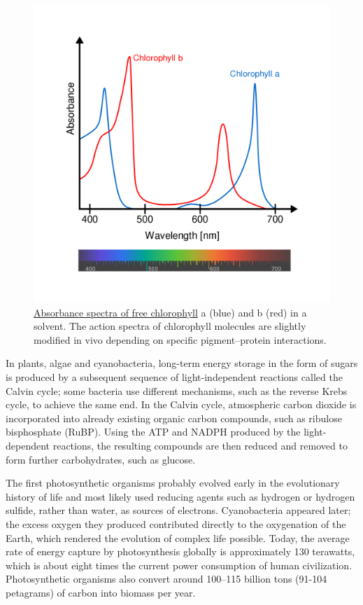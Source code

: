 \begin{figure}

{\centering \includegraphics[width=0.7\linewidth]{./figures/photosynthesis/Chlorophyll_ab_spectra-en} 

}

\caption{\href{https://commons.wikimedia.org/wiki/File:Chlorophyll_ab_spectra-en.svg}{Absorbance spectra of free chlorophyll} a (blue) and b (red) in a solvent. The action spectra of chlorophyll molecules are slightly modified in vivo depending on specific pigment--protein interactions.}\label{fig:chlorophylspectra}
\end{figure}

In plants, algae and cyanobacteria, long-term energy storage in the form of sugars is produced by a subsequent sequence of light-independent reactions called the Calvin cycle; some bacteria use different mechanisms, such as the reverse Krebs cycle, to achieve the same end. In the Calvin cycle, atmospheric carbon dioxide is incorporated into already existing organic carbon compounds, such as ribulose bisphosphate (RuBP). Using the ATP and NADPH produced by the light-dependent reactions, the resulting compounds are then reduced and removed to form further carbohydrates, such as glucose.

The first photosynthetic organisms probably evolved early in the evolutionary history of life and most likely used reducing agents such as hydrogen or hydrogen sulfide, rather than water, as sources of electrons. Cyanobacteria appeared later; the excess oxygen they produced contributed directly to the oxygenation of the Earth, which rendered the evolution of complex life possible. Today, the average rate of energy capture by photosynthesis globally is approximately 130 terawatts, which is about eight times the current power consumption of human civilization. Photosynthetic organisms also convert around 100--115 billion tons (91-104 petagrams) of carbon into biomass per year.

